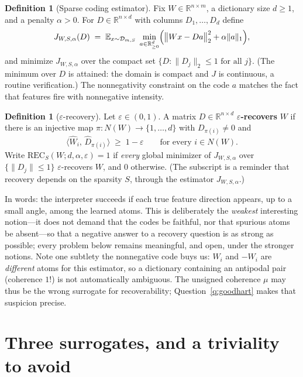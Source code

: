 \documentclass[11pt]{amsart}
\theoremstyle{plain}
\theoremstyle{definition}
\newtheorem{definition}[theorem]{Definition}
\newcommand{\E}{\mathbb{E}}
\newcommand{\R}{\mathbb{R}}
\begin{document}
\begin{definition}[Sparse coding estimator]\label{def:sae}
Fix $W\in\R^{n\times m}$, a dictionary size $d\ge 1$, and a penalty $\alpha>0$. For $D\in\R^{n\times d}$ with columns $D_1,\dots,D_d$ define
\[
J_{W,S,\alpha}(D) \;=\; \E_{x\sim\mathcal D_{m,S}} \;\min_{a\in\R^d_{\ge0}} \Bigl( \bigl\|Wx - Da\bigr\|_2^2 + \alpha\|a\|_1 \Bigr),
\]
and minimize $J_{W,S,\alpha}$ over the compact set $\{D : \|D_j\|_2\le 1 \text{ for all } j\}$. (The minimum over $D$ is attained: the domain is compact and $J$ is continuous, a routine verification.) The nonnegativity constraint on the code $a$ matches the fact that features fire with nonnegative intensity.
\end{definition}

\begin{definition}[$\varepsilon$-recovery]\label{def:rec}
Let $\varepsilon\in(0,1)$. A matrix $D\in\R^{n\times d}$ \textbf{$\varepsilon$-recovers} $W$ if there is an injective map $\pi:N(W)\to\{1,\dots,d\}$ with $D_{\pi(i)}\neq 0$ and
\[
\bigl\langle \widehat W_i,\, \widehat D_{\pi(i)}\bigr\rangle \;\ge\; 1-\varepsilon \qquad\text{for every } i\in N(W).
\]
Write $\mathrm{REC}_S(W; d,\alpha,\varepsilon)=1$ if \emph{every} global minimizer of $J_{W,S,\alpha}$ over $\{\|D_j\|\le1\}$ $\varepsilon$-recovers $W$, and $0$ otherwise. (The subscript is a reminder that recovery depends on the sparsity $S$, through the estimator $J_{W,S,\alpha}$.)
\end{definition}

In words: the interpreter succeeds if each true feature direction appears, up to a small angle, among the learned atoms. This is deliberately the \emph{weakest} interesting notion---it does not demand that the codes be faithful, nor that spurious atoms be absent---so that a negative answer to a recovery question is as strong as possible; every problem below remains meaningful, and open, under the stronger notions. Note one subtlety the nonnegative code buys us: $W_i$ and $-W_i$ are \emph{different} atoms for this estimator, so a dictionary containing an antipodal pair (coherence $1$!) is not automatically ambiguous. The unsigned coherence $\mu$ may thus be the wrong surrogate for recoverability; Question~\ref{q:goodhart} makes that suspicion precise.

\section{Three surrogates, and a triviality to avoid}\label{sec:surrogates}
\end{document}
